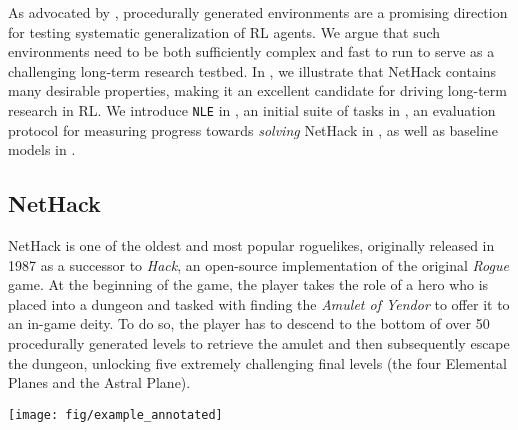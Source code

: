 \documentclass{article}
\newcommand{\nethack}{NetHack}
\newcommand{\NLE}{\texttt{NLE}}
\begin{document}
As advocated by
\cite{justesen2018illuminating,DBLP:conf/ijcai/JulianiKBHTHCTL19,cobbe2019procgen},
procedurally generated environments are a promising direction for testing
systematic generalization of RL agents.  We argue that such environments need to be both sufficiently complex and fast to run to serve as a
challenging long-term research testbed.
In , we illustrate that \nethack{}
contains many desirable properties, making it an excellent candidate for driving long-term research in RL.
We introduce \NLE{} in , an initial
suite of tasks in , an evaluation protocol for measuring progress towards \emph{solving} NetHack in , as well as baseline models in .


\subsection{NetHack}
\label{sec:nethack}
NetHack is one of the oldest and most popular roguelikes,
originally released in 1987 as a successor to \emph{Hack}, an
open-source implementation of the original \emph{Rogue} game.
At the beginning of the game, the player takes the role of a hero who is placed
into a dungeon and tasked with finding the \emph{Amulet of Yendor} to offer it to an in-game deity. To do so, the player
has to descend to the bottom of over 50 procedurally generated
levels to retrieve the amulet and then subsequently escape the
dungeon, unlocking five extremely challenging final levels (the four Elemental Planes and the Astral Plane).

\begin{figure*}[t!]
    \centering
    \texttt{[image: fig/example\_annotated]}
    \caption{Annotated example of an agent at two different stages in
      \nethack{} (Left: a procedurally generated first level of the
      Dungeons of Doom, right: Gnomish Mines). A larger version of this figure is displayed in Figure~\ref{fig:levelBig} in the appendix.}
    \label{fig:level}
\end{figure*}
\end{document}
